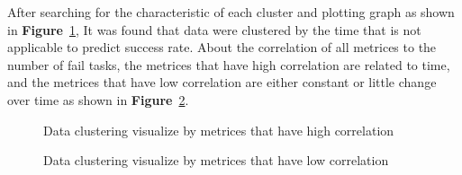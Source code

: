 \documentclass[12pt,oneside,openright,a4paper]{cpe-english-project}
\begin{document}
\hspace{10mm}After searching for the characteristic of each cluster and plotting graph as shown in \textbf{Figure}~\ref{fig:highcorr}, It was found that data were clustered by the time that is not applicable to predict success rate. About the correlation of all metrices to the number of fail tasks, the metrices that have high correlation are related to time, and the metrices that have low correlation are either constant or little change over time as shown in \textbf{Figure}~\ref{fig:lowcorr}.
\begin{figure}[!h]\centering
    \setlength{\fboxrule}{0mm} %
    \setlength{\fboxsep}{0cm}
    \caption{Data clustering visualize by metrices that have high correlation}\label{fig:highcorr}
\end{figure}
\begin{figure}[!h]\centering
    \setlength{\fboxrule}{0mm} %
    \setlength{\fboxsep}{0cm}
    \caption{Data clustering visualize by metrices that have low correlation}\label{fig:lowcorr}
\end{figure}
\end{document}
